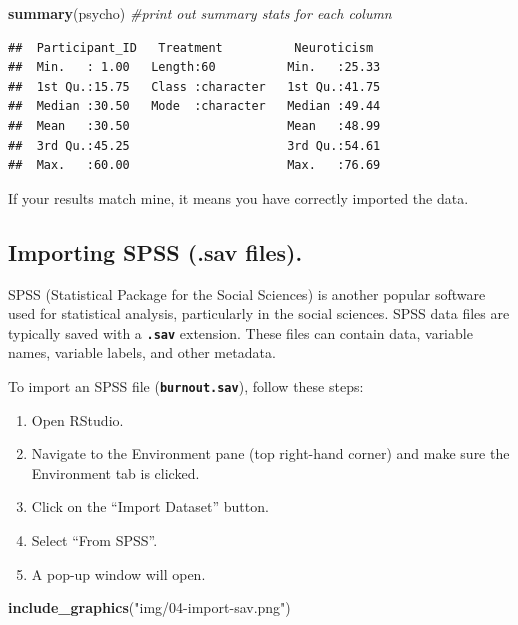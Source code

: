 \documentclass[
]{book}
\newenvironment{Shaded}{\begin{snugshade}}{\end{snugshade}}
\newcommand{\CommentTok}[1]{\textcolor[rgb]{0.56,0.35,0.01}{\textit{#1}}}
\newcommand{\FunctionTok}[1]{\textcolor[rgb]{0.13,0.29,0.53}{\textbf{#1}}}
\newcommand{\NormalTok}[1]{#1}
\newcommand{\StringTok}[1]{\textcolor[rgb]{0.31,0.60,0.02}{#1}}
\begin{document}
\begin{Shaded}
\begin{Highlighting}[]
\FunctionTok{summary}\NormalTok{(psycho) }\CommentTok{\#print out summary stats for each column}
\end{Highlighting}
\end{Shaded}

\begin{verbatim}
##  Participant_ID   Treatment          Neuroticism   
##  Min.   : 1.00   Length:60          Min.   :25.33  
##  1st Qu.:15.75   Class :character   1st Qu.:41.75  
##  Median :30.50   Mode  :character   Median :49.44  
##  Mean   :30.50                      Mean   :48.99  
##  3rd Qu.:45.25                      3rd Qu.:54.61  
##  Max.   :60.00                      Max.   :76.69
\end{verbatim}

If your results match mine, it means you have correctly imported the data.

\hypertarget{importing-spss-.sav-files.}{%
\subsection{Importing SPSS (.sav files).}\label{importing-spss-.sav-files.}}

SPSS (Statistical Package for the Social Sciences) is another popular software used for statistical analysis, particularly in the social sciences. SPSS data files are typically saved with a \textbf{\texttt{.sav}} extension. These files can contain data, variable names, variable labels, and other metadata.

To import an SPSS file (\textbf{\texttt{burnout.sav}}), follow these steps:

\begin{enumerate}
\def\labelenumi{\arabic{enumi}.}
\item
  Open RStudio.
\item
  Navigate to the Environment pane (top right-hand corner) and make sure the Environment tab is clicked.
\item
  Click on the ``Import Dataset'' button.
\item
  Select ``From SPSS''.
\item
  A pop-up window will open.
\end{enumerate}

\begin{Shaded}
\begin{Highlighting}[]
\FunctionTok{include\_graphics}\NormalTok{(}\StringTok{"img/04{-}import{-}sav.png"}\NormalTok{)}
\end{Highlighting}
\end{Shaded}
\end{document}

